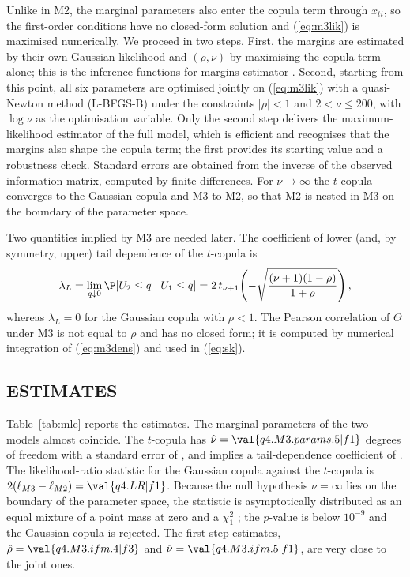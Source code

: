 Unlike in M2, the marginal parameters also enter the copula term through $x_{ti}$, so the first-order conditions have no closed-form solution and (\ref{eq:m3lik}) is maximised numerically. We proceed in two steps. First, the margins are estimated by their own Gaussian likelihood and $(\rho,\nu)$ by maximising the copula term alone; this is the inference-functions-for-margins estimator \citep[Sect.~5.5]{McNeil05}. Second, starting from this point, all six parameters are optimised jointly on (\ref{eq:m3lik}) with a quasi-Newton method (L-BFGS-B) under the constraints $|\rho|<1$ and $2<\nu\le 200$, with $\log\nu$ as the optimisation variable. Only the second step delivers the maximum-likelihood estimator of the full model, which is efficient and recognises that the margins also shape the copula term; the first provides its starting value and a robustness check. Standard errors are obtained from the inverse of the observed information matrix, computed by finite differences. For $\nu\to\infty$ the $t$-copula converges to the Gaussian copula and M3 to M2, so that M2 is nested in M3 on the boundary of the parameter space.

Two quantities implied by M3 are needed later. The coefficient of lower (and, by symmetry, upper) tail dependence of the $t$-copula is \citep[Example~5.33]{McNeil05}
\begin{equation}
\label{eq:taildep}
\lambda_L=\lim_{q\downarrow0}\P[U_2\le q\mid U_1\le q]=2\,t_{\nu+1}\!\left(-\sqrt{\frac{(\nu+1)(1-\rho)}{1+\rho}}\right),
\end{equation}
whereas $\lambda_L=0$ for the Gaussian copula with $\rho<1$. The Pearson correlation of $\Theta$ under M3 is not equal to $\rho$ and has no closed form; it is computed by numerical integration of (\ref{eq:m3dens}) and used in (\ref{eq:sk}).

\subsection{ESTIMATES}
\begin{table}[tb]
\caption{Maximum-likelihood estimates of M2 and M3 (standard errors in parentheses).}
\label{tab:mle}
\centering
{}
\end{table}

Table~\ref{tab:mle} reports the estimates. The marginal parameters of the two models almost coincide. The $t$-copula has $\hat\nu=\val{q4.M3.params.5|f1}$ degrees of freedom with a standard error of , and implies a tail-dependence coefficient of . The likelihood-ratio statistic for the Gaussian copula against the $t$-copula is $2(\ell_{M3}-\ell_{M2})=\val{q4.LR|f1}$. Because the null hypothesis $\nu=\infty$ lies on the boundary of the parameter space, the statistic is asymptotically distributed as an equal mixture of a point mass at zero and a $\chi^2_1$ \citep{SelfLiang87}; the $p$-value is below $10^{-9}$ and the Gaussian copula is rejected. The first-step estimates, $\hat\rho=\val{q4.M3.ifm.4|f3}$ and $\hat\nu=\val{q4.M3.ifm.5|f1}$, are very close to the joint ones.

